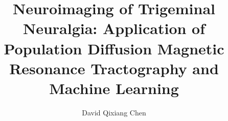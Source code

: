 \documentclass[12pt,oneandahalfspaced]{ut-thesis}
\begin{document}
\nobibliography*

\begin{preliminary}
    

\author{David Qixiang Chen}
\title{Neuroimaging of Trigeminal Neuralgia: Application of Population Diffusion Magnetic Resonance Tractography and Machine Learning}

\maketitle






\renewcommand{\contentsname}{Table of Contents}
\tableofcontents

\printglossary[type=\acronymtype, nonumberlist, title={List of Abbreviations}]
\cleardoublepage
{}
\listoffigures
\cleardoublepage
{}
\listoftables
\cleardoublepage

\end{preliminary}

\setlength{\parskip}{12pt}













\end{document}
